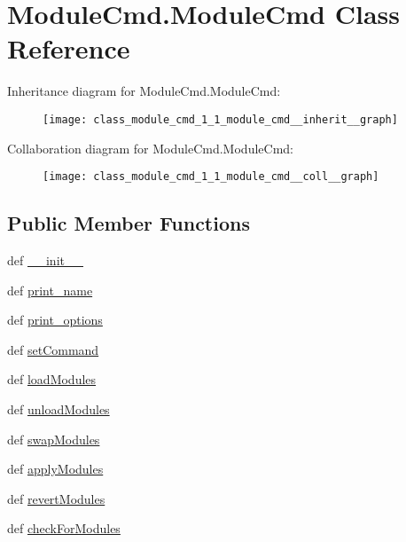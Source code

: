 \hypertarget{class_module_cmd_1_1_module_cmd}{\section{Module\-Cmd.\-Module\-Cmd Class Reference}
\label{class_module_cmd_1_1_module_cmd}
}


Inheritance diagram for Module\-Cmd.\-Module\-Cmd\-:
\nopagebreak
\begin{figure}[H]
\begin{center}
\leavevmode
\texttt{[image: class\_module\_cmd\_1\_1\_module\_cmd\_\_inherit\_\_graph]}
\end{center}
\end{figure}


Collaboration diagram for Module\-Cmd.\-Module\-Cmd\-:
\nopagebreak
\begin{figure}[H]
\begin{center}
\leavevmode
\texttt{[image: class\_module\_cmd\_1\_1\_module\_cmd\_\_coll\_\_graph]}
\end{center}
\end{figure}
\subsection*{Public Member Functions}
\begin{DoxyCompactItemize}
\item 
def \hyperlink{class_module_cmd_1_1_module_cmd_afc2639b024f0254c9a1e4db7c0e890cf}{\-\_\-\-\_\-init\-\_\-\-\_\-}
\item 
def \hyperlink{class_module_cmd_1_1_module_cmd_ae44917ee5bdcc85a4b1675f82a2f03b3}{print\-\_\-name}
\item 
def \hyperlink{class_module_cmd_1_1_module_cmd_a731bb50ac44c88e49675b9790740a9af}{print\-\_\-options}
\item 
def \hyperlink{class_module_cmd_1_1_module_cmd_aafcfb3f7b8d445df29c888c938c932fd}{set\-Command}
\item 
def \hyperlink{class_module_cmd_1_1_module_cmd_acb50720c70196a40e3bde85f79fea3cb}{load\-Modules}
\item 
def \hyperlink{class_module_cmd_1_1_module_cmd_a93a6a59db499c50ffb9ffe8e043a4733}{unload\-Modules}
\item 
def \hyperlink{class_module_cmd_1_1_module_cmd_a085423450e86693c636116c09660cf1b}{swap\-Modules}
\item 
def \hyperlink{class_module_cmd_1_1_module_cmd_a0999730ce14c94350177820be74c354f}{apply\-Modules}
\item 
def \hyperlink{class_module_cmd_1_1_module_cmd_a6cb677e48c0ff6283c701585652e8be1}{revert\-Modules}
\item 
def \hyperlink{class_module_cmd_1_1_module_cmd_a0d21ce30690706552cfae88745fbf339}{check\-For\-Modules}
\end{DoxyCompactItemize}
